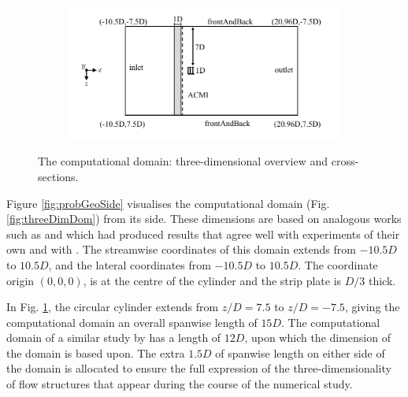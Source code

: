 \documentclass[oneside]{utmthesis}
\let\cite\citep
\begin{document}
\begin{figure} \continuedfloat
  \centering
  \begin{subfigure}[h]{0.98\textwidth}
    \includegraphics[width=\textwidth]{figs/problemGeometryTop}
    \caption{}
    \label{fig:probGeoTop}
  \end{subfigure}

  \caption{The computational domain: three-dimensional overview and cross-sections.} \label{fig:problemGeometry}
\end{figure}

Figure \ref{fig:probGeoSide} visualises the computational domain (Fig. \ref{fig:threeDimDom}) from its side. These dimensions are based on analogous works such as \cite{Maruai2017} and \cite{Maruai2018} which had produced results that agree well with experiments of their own and with \citet{Kawabata2013}. The streamwise coordinates of this domain extends from $-10.5D$ to $10.5D$, and the lateral coordinates from $-10.5D$ to $10.5D$. The coordinate origin $(0,0,0)$, is at the centre of the cylinder and the strip plate is $D/3$ thick.

In Fig. \ref{fig:probGeoTop}, the circular cylinder extends from $z/D=7.5$ to $z/D=-7.5$, giving the computational domain an overall spanwise length of $15D$. The computational domain of a similar study by \citet{Deng2007} has a length of $12D$, upon which the dimension of the domain is based upon. The extra $1.5D$ of spanwise length on either side of the domain is allocated to ensure the full expression of the three-dimensionality of flow structures that appear during the course of the numerical study.
\end{document}
